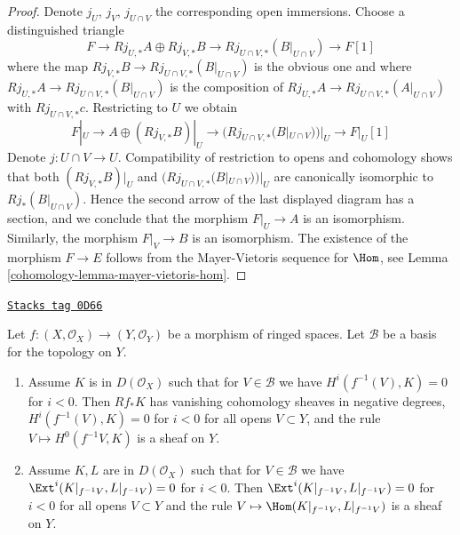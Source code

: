 \begin{proof}

Denote $j_U$, $j_V$, $j_{U \cap V}$ the corresponding open immersions.
Choose a distinguished triangle
$$
F \to Rj_{U, *}A \oplus Rj_{V, *}B \to Rj_{U \cap V, *}(B|_{U \cap V})
\to F[1]
$$
where the map $Rj_{V, *}B \to Rj_{U \cap V, *}(B|_{U \cap V})$ is the
obvious one and where
$Rj_{U, *}A \to Rj_{U \cap V, *}(B|_{U \cap V})$
is the composition of
$Rj_{U, *}A \to Rj_{U \cap V, *}(A|_{U \cap V})$
with $Rj_{U \cap V, *}c$. Restricting to $U$ we obtain
$$
F|_U \to A \oplus (Rj_{V, *}B)|_U \to (Rj_{U \cap V, *}(B|_{U \cap V}))|_U
\to F|_U[1]
$$
Denote $j : U \cap V \to U$. Compatibility of restriction to opens and
cohomology shows that both
$(Rj_{V, *}B)|_U$ and $(Rj_{U \cap V, *}(B|_{U \cap V}))|_U$
are canonically isomorphic to $Rj_*(B|_{U \cap V})$.
Hence the second arrow of the last displayed diagram has
a section, and we conclude that the morphism $F|_U \to A$ is
an isomorphism. Similarly, the morphism $F|_V \to B$ is an
isomorphism. The existence of the morphism $F \to E$ follows
from the Mayer-Vietoris sequence for $\Hom$, see
Lemma \ref{cohomology-lemma-mayer-vietoris-hom}.
\end{proof}

\begin{lemma}
\label{cohomology-lemma-vanishing-and-glueing}
\href{https://stacks.math.columbia.edu/tag/0D66}{\texttt{Stacks tag 0D66}}

Let $f : (X, \mathcal{O}_X) \to (Y, \mathcal{O}_Y)$ be a morphism
of ringed spaces. Let $\mathcal{B}$ be a basis for the topology on $Y$.
\begin{enumerate}
\item Assume $K$ is in $D(\mathcal{O}_X)$ such that
for $V \in \mathcal{B}$ we have $H^i(f^{-1}(V), K) = 0$ for $i < 0$.
Then $Rf_*K$ has vanishing cohomology sheaves in negative degrees,
$H^i(f^{-1}(V), K) = 0$ for $i < 0$ for all opens $V \subset Y$, and
the rule $V \mapsto H^0(f^{-1}V, K)$ is a sheaf on $Y$.
\item Assume $K, L$ are in $D(\mathcal{O}_X)$ such that
for $V \in \mathcal{B}$ we have
$\Ext^i(K|_{f^{-1}V}, L|_{f^{-1}V}) = 0$ for $i < 0$.
Then $\Ext^i(K|_{f^{-1}V}, L|_{f^{-1}V}) = 0$ for $i < 0$
for all opens $V \subset Y$ and
the rule $V \mapsto \Hom(K|_{f^{-1}V}, L|_{f^{-1}V})$ is a sheaf on $Y$.
\end{enumerate}
\end{lemma}

